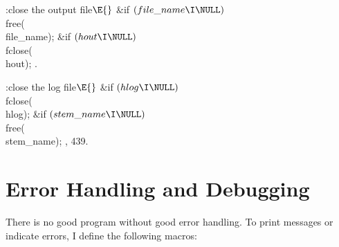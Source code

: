 \Y\B\4:close the output file\X${}\E{}$\6
\&{if} ${}(\index{file name+\\{file\_name}}\\{file\_name}\I\NULL){}$\1\5
\\{free}(\\{file\_name});\2\6
\&{if} ${}(\index{hout+\\{hout}}\\{hout}\I\NULL){}$\1\5
\\{fclose}(\\{hout});\2
.\Y
\fi

\Y\B\4:close the log file\X${}\E{}$\6
\&{if} ${}(\index{hlog+\\{hlog}}\\{hlog}\I\NULL){}$\1\5
\\{fclose}(\\{hlog});\2\6
\&{if} ${}(\index{stem name+\\{stem\_name}}\\{stem\_name}\I\NULL){}$\1\5
\\{free}(\\{stem\_name});\2
, 439.\Y
\fi




\section{Error Handling and Debugging}\label{error_section}
There is no good program without good error handling.
To print messages or indicate errors, I define the following macros:


